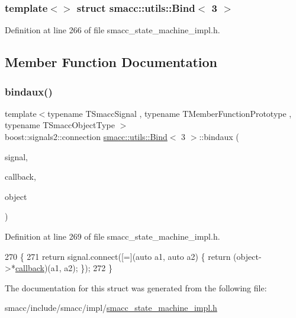 \subsubsection*{template$<$$>$\newline
struct smacc\+::utils\+::\+Bind$<$ 3 $>$}



Definition at line 266 of file smacc\+\_\+state\+\_\+machine\+\_\+impl.\+h.



\subsection{Member Function Documentation}
\mbox{\label{structsmacc_1_1utils_1_1Bind_3_013_01_4_a8958f16a2a40b187e6500a76cfaeed63}} 
\subsubsection{\texorpdfstring{bindaux()}{bindaux()}}
{\footnotesize\ttfamily template$<$typename T\+Smacc\+Signal , typename T\+Member\+Function\+Prototype , typename T\+Smacc\+Object\+Type $>$ \\
boost\+::signals2\+::connection \hyperlink{structsmacc_1_1utils_1_1Bind}{smacc\+::utils\+::\+Bind}$<$ 3 $>$\+::bindaux (\begin{DoxyParamCaption}\item[{T\+Smacc\+Signal \&}]{signal,  }\item[{T\+Member\+Function\+Prototype}]{callback,  }\item[{T\+Smacc\+Object\+Type $\ast$}]{object }\end{DoxyParamCaption})\hspace{0.3cm}{\ttfamily [inline]}}



Definition at line 269 of file smacc\+\_\+state\+\_\+machine\+\_\+impl.\+h.


\begin{DoxyCode}
270   \{
271     \textcolor{keywordflow}{return} signal.connect([=](\textcolor{keyword}{auto} a1, \textcolor{keyword}{auto} a2) \{ \textcolor{keywordflow}{return} (object->*\hyperlink{servers_2opencv__perception__node_2opencv__perception__node_8cpp_a050e697bd654facce10ea3f6549669b3}{callback})(a1, a2); \});
272   \}
\end{DoxyCode}


The documentation for this struct was generated from the following file\+:\begin{DoxyCompactItemize}
\item 
smacc/include/smacc/impl/\hyperlink{smacc__state__machine__impl_8h}{smacc\+\_\+state\+\_\+machine\+\_\+impl.\+h}\end{DoxyCompactItemize}
